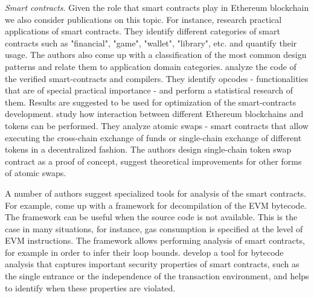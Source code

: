  

\textit{Smart contracts}. Given the role that smart contracts play in Ethereum blockchain we also consider publications on this topic. 
For instance, \cite{bartoletti2017dissecting} research practical applications of smart contracts. 
They identify different categories of smart contracts such as "financial", "game", "wallet", "library", etc. and quantify their usage.
The authors also come up with a classification of the most common design patterns and relate them to application domain categories.
\cite{bistarelli2019analysis} analyze the code of the verified smart-contracts and compilers. 
They identify opcodes - functionalities that are of special practical importance - and perform a statistical research of them. 
Results are suggested to be used for optimization of the smart-contracts development.
\cite{bennink2018analysis} study how interaction between different Ethereum blockchains and tokens can be performed. 
They analyze atomic swaps - smart contracts that allow executing the cross-chain exchange of funds or single-chain exchange of different tokens in a decentralized fashion.
The authors design single-chain token swap contract as a proof of concept, suggest theoretical improvements for other forms of atomic swaps.

A number of authors suggest specialized tools for analysis of the smart contracts. 
For example, \cite{albert2018ethir} come up with a framework for decompilation of the EVM bytecode.
The framework can be useful when the source code is not available.
This is the case in many situations, for instance, gas consumption is specified at the level of EVM instructions.
The framework allows performing analysis of smart contracts, for example in order to infer their loop bounds.
\cite{grishchenkoethertrust} develop a tool for bytecode analysis that captures important security properties of smart contracts, such as the single entrance or the independence of the transaction environment, and helps to identify when these properties are violated.

